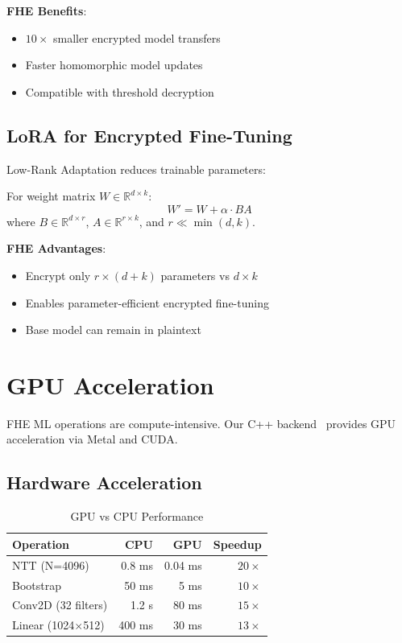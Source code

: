 \documentclass{../shared/luxfhe}
\begin{document}
\textbf{FHE Benefits}:
\begin{itemize}[noitemsep]
    \item $10\times$ smaller encrypted model transfers
    \item Faster homomorphic model updates
    \item Compatible with threshold decryption
\end{itemize}

\subsection{LoRA for Encrypted Fine-Tuning}

Low-Rank Adaptation reduces trainable parameters:

\begin{definition}
For weight matrix $W \in \mathbb{R}^{d \times k}$:
\[
W' = W + \alpha \cdot B A
\]
where $B \in \mathbb{R}^{d \times r}$, $A \in \mathbb{R}^{r \times k}$, and $r \ll \min(d, k)$.
\end{definition}

\textbf{FHE Advantages}:
\begin{itemize}[noitemsep]
    \item Encrypt only $r \times (d + k)$ parameters vs $d \times k$
    \item Enables parameter-efficient encrypted fine-tuning
    \item Base model can remain in plaintext
\end{itemize}

\section{GPU Acceleration}

FHE ML operations are compute-intensive. Our C++ backend~\cite{luxcpp-fhe} provides GPU acceleration via Metal and CUDA.

\subsection{Hardware Acceleration}

\begin{table}[h]
\centering
\caption{GPU vs CPU Performance}
\begin{tabular}{lrrr}
\toprule
Operation & CPU & GPU & Speedup \\
\midrule
NTT (N=4096) & 0.8 ms & 0.04 ms & $20\times$ \\
Bootstrap & 50 ms & 5 ms & $10\times$ \\
Conv2D (32 filters) & 1.2 s & 80 ms & $15\times$ \\
Linear (1024$\times$512) & 400 ms & 30 ms & $13\times$ \\
\bottomrule
\end{tabular}
\end{table}
\end{document}
